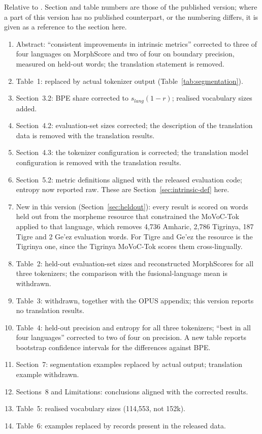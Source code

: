 \documentclass[11pt]{article}
\newcommand{\movoctok}{MoVoC-Tok}
\begin{document}
Relative to \citet{teklehaymanot-etal-2025-movoc}. Section and table numbers
are those of the published version; where a part of this version has no
published counterpart, or the numbering differs, it is given as a reference to
the section here.
\begin{enumerate}\setlength\itemsep{0pt}
\item Abstract: ``consistent improvements in intrinsic metrics'' corrected to
  three of four languages on MorphScore and two of four on boundary precision,
  measured on held-out words; the translation statement is removed.
\item Table~1: replaced by actual tokenizer output (Table~\ref{tab:segmentation}).
\item Section~3.2: BPE share corrected to $s_{lang}(1-r)$; realised
  vocabulary sizes added.
\item Section~4.2: evaluation-set sizes corrected; the description of the
  translation data is removed with the translation results.
\item Section~4.3: the tokenizer configuration is corrected; the translation
  model configuration is removed with the translation results.
\item Section~5.2: metric definitions aligned with the released evaluation
  code; entropy now reported raw. These are Section~\ref{sec:intrinsic-def}
  here.
\item New in this version (Section~\ref{sec:heldout}): every result is scored
  on words held out from the morpheme resource that constrained the
  \movoctok{} applied to that language, which removes 4,736 Amharic, 2,786
  Tigrinya, 187 Tigre and 2 Ge'ez evaluation words. For Tigre and Ge'ez the
  resource is the Tigrinya one, since the Tigrinya \movoctok{} scores them
  cross-lingually.
\item Table~2: held-out evaluation-set sizes and reconstructed MorphScores for
  all three tokenizers; the comparison with the fusional-language mean is
  withdrawn.
\item Table~3: withdrawn, together with the OPUS appendix; this version
  reports no translation results.
\item Table~4: held-out precision and entropy for all three tokenizers;
  ``best in all four languages'' corrected to two of four on precision. A new
  table reports bootstrap confidence intervals for the differences against BPE.
\item Section~7: segmentation examples replaced by actual output; translation
  example withdrawn.
\item Sections~8 and Limitations: conclusions aligned with the corrected
  results.
\item Table~5: realised vocabulary sizes (114,553, not 152k).
\item Table~6: examples replaced by records present in the released data.
\end{enumerate}
\end{document}
